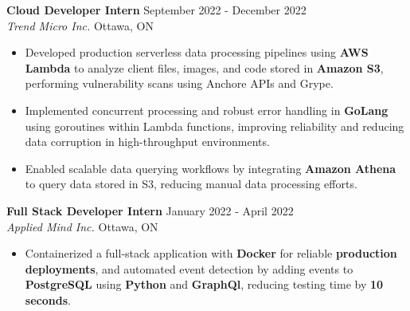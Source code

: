 \documentclass[a4paper]{article}
\begin{document}
\textbf{Cloud Developer Intern} \hfill September 2022 - December 2022\\
\textit{Trend Micro Inc.} \hfill Ottawa, ON\\
\vspace{-2mm}
\begin{itemize} \itemsep -4pt

\item Developed production serverless data processing pipelines using \textbf{AWS Lambda} to analyze client files, images, and code stored in \textbf{Amazon S3}, performing vulnerability scans using Anchore APIs and Grype.

\item Implemented concurrent processing and robust error handling in \textbf{GoLang} using goroutines within Lambda functions, improving reliability and reducing data corruption in high-throughput environments.

\item Enabled scalable data querying workflows by integrating \textbf{Amazon Athena} to query data stored in S3, reducing manual data processing efforts.

\end{itemize}

\textbf{Full Stack Developer Intern} \hfill January 2022 - April 2022\\
\textit{Applied Mind Inc.} \hfill Ottawa, ON\\
\vspace{-2mm}
\begin{itemize} \itemsep -4pt
\item Containerized a full-stack application with \textbf{Docker} for reliable \textbf{production deployments}, and automated event detection by adding events to \textbf{PostgreSQL} using \textbf{Python} and \textbf{GraphQl}, reducing testing time by \textbf{10 seconds}.
\end{itemize}

\vspace{5mm}
\vspace*{-1mm}
\vspace*{5mm}
\end{document}
